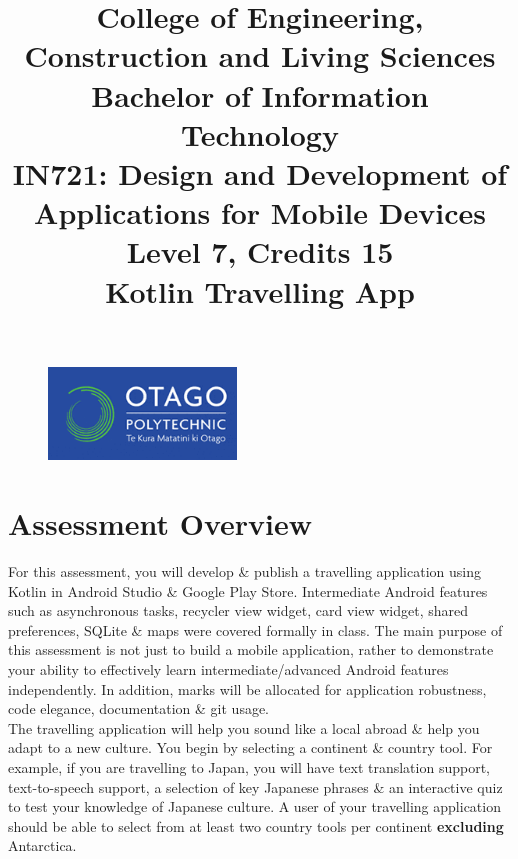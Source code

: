\documentclass{article}
\author{}
\begin{document}
\begin{figure}
    \centering
    \includegraphics[width=50mm]{../resources/img/logo.png}
\end{figure}

\title{College of Engineering, Construction and Living Sciences\\Bachelor of Information Technology\\IN721: Design and Development of Applications for Mobile Devices\\Level 7, Credits 15\\\textbf{Kotlin Travelling App}}
\date{}
\maketitle

\section*{Assessment Overview}
For this assessment, you will develop \& publish a travelling application using Kotlin in Android Studio \& Google Play Store. 
Intermediate Android features such as asynchronous tasks, recycler view widget, card view widget, shared preferences, SQLite \& maps were covered formally in class. The main purpose of this assessment is not just to build a mobile application, rather to demonstrate your ability to effectively learn intermediate/advanced Android features independently. In addition, marks will be allocated for application robustness, code elegance, documentation \& git usage. \\

The travelling application will help you sound like a local abroad \& help you adapt to a new culture. You begin by selecting a continent \& country tool. For example, if you are travelling to Japan, you will have text translation support, text-to-speech support, a selection of key Japanese phrases \& an interactive quiz to test your knowledge of Japanese culture. A user of your travelling application should be able to select from at least two country tools per continent \textbf{excluding} Antarctica.
\end{document}

